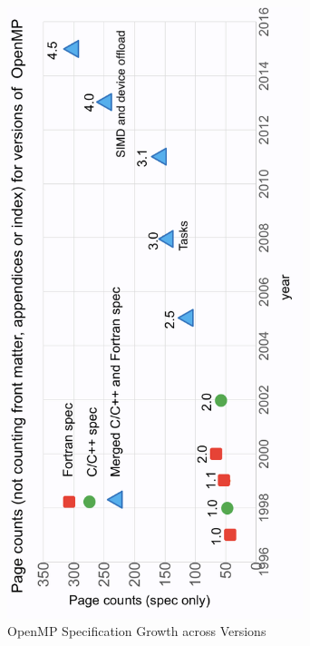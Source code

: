 \begin{figure}
  \centering
  \includegraphics[width=3.4in]{pics/opcounts-marked.png}
  \caption{OpenMP Specification Growth across Versions\label{omppcount}}
\end{figure}


